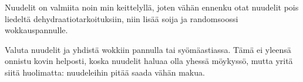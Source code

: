 \begin{recipe}
{    	Nuudelit on valmiita noin \unit[2-3]{min} keittelyllä, joten vähän ennenku otat nuudelit pois 
    	liedeltä dehydraatiotarkoituksiin, niin lisää soija ja randomsoossi wokkauspannulle. 

    	Valuta nuudelit ja yhdistä wokkiin pannulla tai syömäastiassa. Tämä ei yleensä onnistu 
    	kovin helposti, koska nuudelit haluaa olla yhessä möykyssö, mutta yritä siitä 
    	huolimatta: nuudeleihin pitää saada vähän makua. 
    }

    
\end{recipe}

